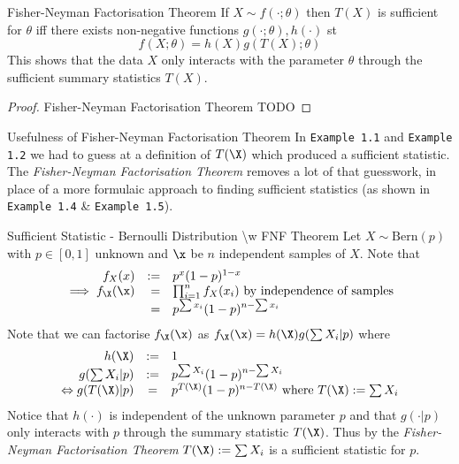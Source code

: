 \documentclass[11pt,a4paper]{article}
\begin{document}
  \begin{theorem}{Fisher-Neyman Factorisation Theorem}
    If $X\sim f(\cdot;\theta)$ then $T(X)$ is sufficient for $\theta$ iff there exists non-negative functions $g(\cdot;\theta),h(\cdot)$ st
    \[ f(X;\theta)=h(X)g(T(X);\theta) \]
    This shows that the data $X$ only interacts with the parameter $\theta$ through the sufficient summary statistics $T(X)$.
  \end{theorem}

  \begin{proof}{Fisher-Neyman Factorisation Theorem}
    TODO
  \end{proof}

  \begin{remark}{Usefulness of Fisher-Neyman Factorisation Theorem}
    In \texttt{Example 1.1}  and \texttt{Example 1.2} we had to guess at a definition of $T(\X)$ which produced a sufficient statistic. The \textit{Fisher-Neyman Factorisation Theorem} removes a lot of that guesswork, in place of a more formulaic approach to finding sufficient statistics (as shown in \texttt{Example 1.4} \& \texttt{Example 1.5}).
  \end{remark}

  \begin{example}{Sufficient Statistic - Bernoulli Distribution {\textbackslash}w FNF Theorem}
    Let $X\sim\text{Bern}(p)$ with $p\in[0,1]$ unknown and $\x$ be $n$ independent samples of $X$. Note that
    \[\begin{array}{rrl}
      f_X(x)&:=&p^x(1-p)^{1-x}\\
      \implies f_\X(\x)&=&\prod_{i=1}^nf_X(x_i)\text{ by independence of samples}\\
      &=&p^{\sum x_i}(1-p)^{n-\sum x_i}
    \end{array}\]
    Note that we can factorise $f_\X(\x)$ as $f_\X(\x)=h(\X)g(\sum X_i|p)$ where
    \[\begin{array}{rcl}
      h(\X)&:=&1\\
      g(\sum X_i|p)&:=&p^{\sum X_i}(1-p)^{n-\sum X_i}\\
      \Leftrightarrow g(T(\X)|p)&=&p^{T(\X)}(1-p)^{n-T(\X)}\text{ where }T(\X):=\sum X_i
    \end{array}\]
    Notice that $h(\cdot)$ is independent of the unknown parameter $p$ and that $g(\cdot|p)$ only interacts with $p$ through the summary statistic $T(\X)$. Thus by the \textit{Fisher-Neyman Factorisation Theorem} $T(\X):=\sum X_i$ is a sufficient statistic for $p$.
  \end{example}
\end{document}
